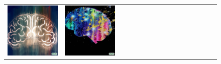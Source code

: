 \begin{figure}[ht!]
\begin{adjustwidth}{-0.8in}{-0.5in}
\begin{tabular}{cccccccccccccccccccc}
\multicolumn{3}{c}{\includegraphics[width=\twobytwocolwidth\textwidth]{figures/cherries/ai_2.jpg}} &
\multicolumn{3}{c}{\includegraphics[width=\twobytwocolwidth\textwidth]{figures/cherries/ai_3.jpg}} \\

\end{tabular}
\end{adjustwidth}
\end{figure}

